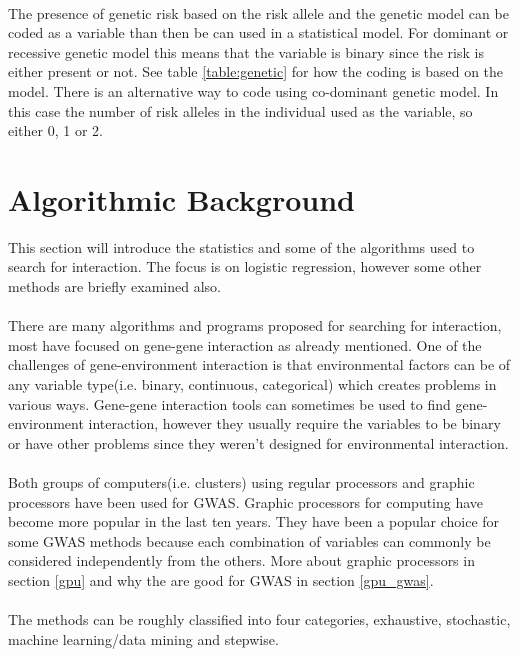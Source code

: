 \documentclass[10pt,a4paper]{report}
\begin{document}
\\
The presence of genetic risk based on the risk allele and the genetic model can be coded as a variable than then be can used in a statistical model. For dominant or recessive genetic model this means that the variable is binary since the risk is either present or not. See table \ref{table:genetic} for how the coding is based on the model. There is an alternative way to code using co-dominant genetic model. In this case the number of risk alleles in the individual used as the variable, so either 0, 1 or 2.

\section{Algorithmic Background}
This section will introduce the statistics and some of the algorithms used to search for interaction. The focus is on logistic regression, however some other methods are briefly examined also.\\
\\
There are many algorithms and programs proposed for searching for interaction, most have focused on gene-gene interaction as already mentioned\cite{gene_enviroment_2013}. One of the challenges of gene-environment interaction is that environmental factors can be of any variable type(i.e. binary, continuous, categorical) which creates problems in various ways\cite{gene_enviroment_2013}. Gene-gene interaction tools can sometimes be used to find gene-environment interaction, however they usually require the variables to be binary or have other problems since they weren't designed for environmental interaction\cite{gene_enviroment_2013}.\\
\\
Both groups of computers(i.e. clusters) using regular processors\cite{biforce} and graphic processors\cite{gwis,gboost,gmdr_gpu,cuda_lr,genie_2012,plink_gpu} have been used for GWAS. Graphic processors for computing have become more popular in the last ten years. They have been a popular choice for some GWAS methods because each combination of variables can commonly be considered independently from the others. More about graphic processors in section \ref{gpu} and why the are good for GWAS in section \ref{gpu_gwas}.\\
\\
The methods can be roughly classified into four categories, exhaustive, stochastic, machine learning/data mining and stepwise\cite{fast_high_order_cluster}.\\
\\
\end{document}

